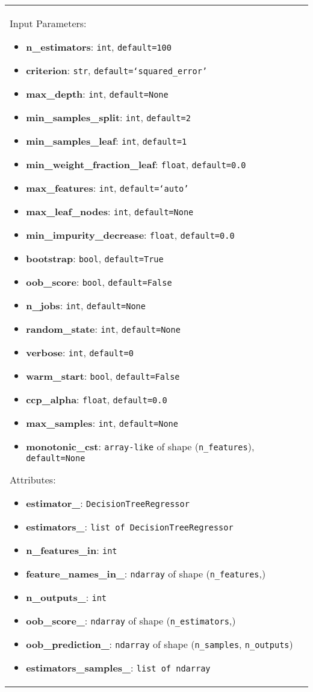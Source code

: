 \begin{longtable}{|l|p{12cm}|}
    Input Parameters:
    \begin{itemize}
		\item \textbf{n\_estimators}: \texttt{int}, \texttt{default=100}
		\item \textbf{criterion}: \texttt{str}, \texttt{default=`squared\_error'}
		\item \textbf{max\_depth}: \texttt{int}, \texttt{default=None}
		\item \textbf{min\_samples\_split}: \texttt{int}, \texttt{default=2}
		\item \textbf{min\_samples\_leaf}: \texttt{int}, \texttt{default=1}
		\item \textbf{min\_weight\_fraction\_leaf}: \texttt{float}, \texttt{default=0.0}
		\item \textbf{max\_features}: \texttt{int}, \texttt{default=`auto'}
		\item \textbf{max\_leaf\_nodes}: \texttt{int}, \texttt{default=None}
		\item \textbf{min\_impurity\_decrease}: \texttt{float}, \texttt{default=0.0}
		\item \textbf{bootstrap}: \texttt{bool}, \texttt{default=True}
		\item \textbf{oob\_score}: \texttt{bool}, \texttt{default=False}
		\item \textbf{n\_jobs}: \texttt{int}, \texttt{default=None}
		\item \textbf{random\_state}: \texttt{int}, \texttt{default=None}
		\item \textbf{verbose}: \texttt{int}, \texttt{default=0}
		\item \textbf{warm\_start}: \texttt{bool}, \texttt{default=False}
		\item \textbf{ccp\_alpha}: \texttt{float}, \texttt{default=0.0}
		\item \textbf{max\_samples}: \texttt{int}, \texttt{default=None}
		\item \textbf{monotonic\_cst}: \texttt{array-like} of shape (\texttt{n\_features}), \texttt{default=None}
	\end{itemize}

	Attributes:
	\begin{itemize}
		\item \textbf{estimator\_}: \texttt{DecisionTreeRegressor}
		\item \textbf{estimators\_}: \texttt{list of DecisionTreeRegressor}
		\item \textbf{n\_features\_in}: \texttt{int}
		\item \textbf{feature\_names\_in\_}: \texttt{ndarray} of shape (\texttt{n\_features},)
		\item \textbf{n\_outputs\_}: \texttt{int}
		\item \textbf{oob\_score\_}: \texttt{ndarray} of shape (\texttt{n\_estimators},)
		\item \textbf{oob\_prediction\_}: \texttt{ndarray} of shape (\texttt{n\_samples}, \texttt{n\_outputs})
		\item \textbf{estimators\_samples\_}: \texttt{list of ndarray}
	\end{itemize}


\end{longtable}
